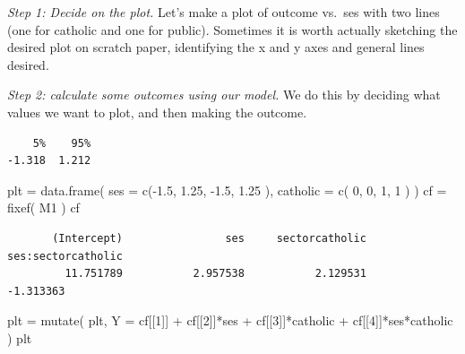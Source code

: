 \documentclass[
  letterpaper,
  DIV=11,
  numbers=noendperiod]{scrreprt}
\newenvironment{Shaded}{}{}
\newcommand{\AttributeTok}[1]{\textcolor[rgb]{0.49,0.56,0.16}{#1}}
\newcommand{\DecValTok}[1]{\textcolor[rgb]{0.25,0.63,0.44}{#1}}
\newcommand{\FloatTok}[1]{\textcolor[rgb]{0.25,0.63,0.44}{#1}}
\newcommand{\FunctionTok}[1]{\textcolor[rgb]{0.02,0.16,0.49}{#1}}
\newcommand{\NormalTok}[1]{#1}
\newcommand{\OtherTok}[1]{\textcolor[rgb]{0.00,0.44,0.13}{#1}}
\newcommand{\SpecialCharTok}[1]{\textcolor[rgb]{0.25,0.44,0.63}{#1}}
\begin{document}
\emph{Step 1: Decide on the plot.} Let's make a plot of outcome vs.~ses
with two lines (one for catholic and one for public). Sometimes it is
worth actually sketching the desired plot on scratch paper, identifying
the x and y axes and general lines desired.

\emph{Step 2: calculate some outcomes using our model.} We do this by
deciding what values we want to plot, and then making the outcome.

\begin{Shaded}
\end{Shaded}

\begin{verbatim}
    5%    95% 
-1.318  1.212 
\end{verbatim}

\begin{Shaded}
\begin{Highlighting}[]
\NormalTok{plt }\OtherTok{=} \FunctionTok{data.frame}\NormalTok{( }\AttributeTok{ses =} \FunctionTok{c}\NormalTok{(}\SpecialCharTok{{-}}\FloatTok{1.5}\NormalTok{, }\FloatTok{1.25}\NormalTok{, }\SpecialCharTok{{-}}\FloatTok{1.5}\NormalTok{, }\FloatTok{1.25}\NormalTok{ ),}
                  \AttributeTok{catholic =} \FunctionTok{c}\NormalTok{( }\DecValTok{0}\NormalTok{, }\DecValTok{0}\NormalTok{, }\DecValTok{1}\NormalTok{, }\DecValTok{1}\NormalTok{ ) )}
\NormalTok{cf }\OtherTok{=} \FunctionTok{fixef}\NormalTok{( M1 )}
\NormalTok{cf}
\end{Highlighting}
\end{Shaded}

\begin{verbatim}
       (Intercept)                ses     sectorcatholic ses:sectorcatholic 
         11.751789           2.957538           2.129531          -1.313363 
\end{verbatim}

\begin{Shaded}
\begin{Highlighting}[]
\NormalTok{plt }\OtherTok{=} \FunctionTok{mutate}\NormalTok{( plt,}
              \AttributeTok{Y =}\NormalTok{ cf[[}\DecValTok{1}\NormalTok{]] }\SpecialCharTok{+}\NormalTok{ cf[[}\DecValTok{2}\NormalTok{]]}\SpecialCharTok{*}\NormalTok{ses }\SpecialCharTok{+}\NormalTok{ cf[[}\DecValTok{3}\NormalTok{]]}\SpecialCharTok{*}\NormalTok{catholic }\SpecialCharTok{+}\NormalTok{ cf[[}\DecValTok{4}\NormalTok{]]}\SpecialCharTok{*}\NormalTok{ses}\SpecialCharTok{*}\NormalTok{catholic )}
\NormalTok{plt}
\end{Highlighting}
\end{Shaded}
\end{document}
